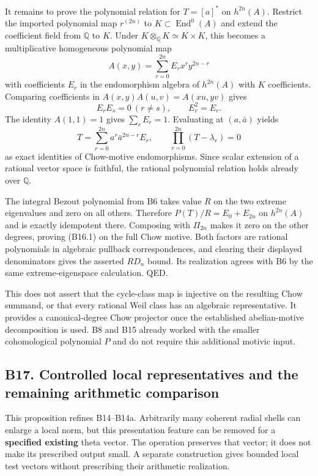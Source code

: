 It remains to prove the polynomial relation for \(T=[a]^*\) on \(h^{2n}(A)\). Restrict the imported polynomial map \(r^{(2n)}\) to \(K\subset\operatorname{End}^0(A)\) and extend the coefficient field from \(\mathbb Q\) to \(K\). Under \(K\otimes_{\mathbb Q}K\simeq K\times K\), this becomes a multiplicative homogeneous polynomial map \[
 A(x,y)=\sum_{r=0}^{2n}E_r x^r y^{2n-r}
\] with coefficients \(E_r\) in the endomorphism algebra of \(h^{2n}(A)\) with \(K\) coefficients. Comparing coefficients in \(A(x,y)A(u,v)=A(xu,yv)\) gives \[
 E_rE_s=0\ (r\ne s),\qquad E_r^2=E_r.
\] The identity \(A(1,1)=1\) gives \(\sum_r E_r=1\). Evaluating at \((a,\bar a)\) yields \[
 T=\sum_{r=0}^{2n}a^r\bar a^{2n-r}E_r,
 \qquad \prod_{r=0}^{2n}(T-\lambda_r)=0
\] as exact identities of Chow-motive endomorphisms. Since scalar extension of a rational vector space is faithful, the rational polynomial relation holds already over \(\mathbb Q\).

The integral Bezout polynomial from B6 takes value \(R\) on the two extreme eigenvalues and zero on all others. Therefore \(P(T)/R=E_0+E_{2n}\) on \(h^{2n}(A)\) and is exactly idempotent there. Composing with \(\Pi_{2n}\) makes it zero on the other degrees, proving (B16.1) on the full Chow motive. Both factors are rational polynomials in algebraic pullback correspondences, and clearing their displayed denominators gives the asserted \(R D_n\) bound. Its realization agrees with B6 by the same extreme-eigenspace calculation. QED.

This does not assert that the cycle-class map is injective on the resulting Chow summand, or that every rational Weil class has an algebraic representative. It provides a canonical-degree Chow projector once the established abelian-motive decomposition is used. B8 and B15 already worked with the smaller cohomological polynomial \(P\) and do not require this additional motivic input.

\subsection{B17. Controlled local representatives and the remaining arithmetic comparison}\label{b17.-controlled-local-representatives-and-the-remaining-arithmetic-comparison}

This proposition refines B14--B14a. Arbitrarily many coherent radial shells can enlarge a local norm, but this presentation feature can be removed for a \textbf{specified existing} theta vector. The operation preserves that vector; it does not make its prescribed output small. A separate construction gives bounded local test vectors without prescribing their arithmetic realization.

